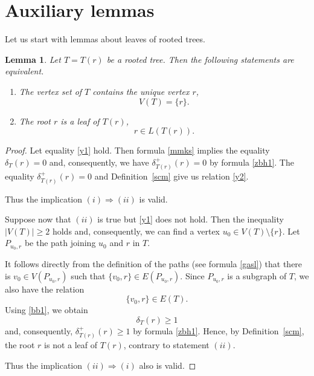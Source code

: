\documentclass{raex}
\newtheorem{lem}[thm]{Lemma}
\theoremstyle{definition}
\theoremstyle{remark}
\numberwithin{equation}{section}
\begin{document}
\section{Auxiliary lemmas}\label{seq3}

Let us start with lemmas about leaves of rooted trees.


\begin{lem}\label{pit}
Let $T=T(r)$ be a rooted tree. Then the following statements are equivalent.
\begin{enumerate}
\item
The vertex set of $T$ contains the unique vertex $r$, 
\begin{equation}
    \label{y1}
V(T)=\{r\}. 
\end{equation}

\item
The root $r$ is a leaf of $T(r)$,
\begin{equation}
    \label{y2}
r\in L(T(r)).
\end{equation}
\end{enumerate}
\end{lem}

\begin{proof}
Let equality \eqref{y1} hold. 
Then formula \eqref{mmks} implies the equality
\(
\delta_T(r)=0 
\)
and, consequently,
we have
\(
\delta_{T(r)}^+(r)=0
\)
by formula \eqref{zbh1}.
The equality $\delta_{T(r)}^+(r)=0$ and Definition~\ref{scm} give us relation 
\eqref{y2}. 

Thus the implication $(i)\Rightarrow(ii)$ is valid.

Suppose now that $(ii)$ is true but \eqref{y1} does not hold. Then the inequality
\(
|V(T)|\ge 2
\)
holds and, consequently, we can find a vertex
\(
u_0\in V(T)\setminus\{r\}.
\)
Let $P_{u_0,r}$ be the path joining $u_0$ and $r$ in $T$.

It follows directly from the definition of the paths (see formula \eqref{gasl}) that 
there is $v_{0}\in V(P_{u_{0},r})$ such that
\(
\{v_{0},r\}\in E(P_{u_{0},r}).
\)
Since $P_{u_{0},r}$ is a subgraph of $T$,
we also have the relation
\begin{equation}
    \label{bb1}
\{v_{0},r\}\in E(T). 
\end{equation}
Using \eqref{bb1}, we obtain
\begin{equation*}
\delta_{T}(r)
\geq 1
\end{equation*}
and, consequently, $\delta_{T(r)}^+(r)
\geq 1$ by formula \eqref{zbh1}.
Hence, by Definition~\ref{scm}, the root $r$ is not a leaf of $T(r)$, contrary to statement $(ii)$.


 Thus the implication
\(
(ii)\Rightarrow(i)
\)
also is valid.
\end{proof}
\end{document}
